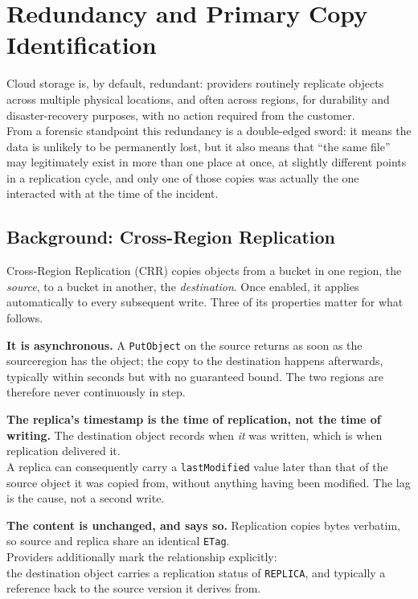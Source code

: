 \section{Redundancy and Primary Copy Identification}

Cloud storage is, by default, redundant: providers routinely replicate objects across multiple physical locations, and often across regions, for durability and disaster-recovery purposes, with no action required from the customer.\\
From a forensic standpoint this redundancy is a double-edged sword: it means the data is unlikely to be permanently lost, but it also means that ``the same file'' may legitimately exist in more than one place at once, at slightly different points in a replication cycle, and only one of those copies was actually the one interacted with at the time of the incident.

\subsection{Background: Cross-Region Replication}

Cross-Region Replication (CRR) copies objects from a bucket in one region, the \emph{source}, to a
bucket in another, the \emph{destination}. Once enabled, it applies automatically to every
subsequent write. Three of its properties matter for what follows.
\medskip

\noindent
\textbf{It is asynchronous.} A \texttt{PutObject} on the source returns as soon as the sourceregion has the object; the copy to the destination happens afterwards, typically within seconds but with no guaranteed bound. The two regions are therefore never continuously in step.
\medskip

\noindent
\textbf{The replica's timestamp is the time of replication, not the time of writing.} The destination object records when \emph{it} was written, which is when replication delivered it.\\
A replica can consequently carry a \texttt{lastModified} value later than that of the source object it was copied from, without anything having been modified. The lag is the cause, not a second write.
\medskip

\noindent
\textbf{The content is unchanged, and says so.} Replication copies bytes verbatim, so source and replica share an identical \texttt{ETag}.\\
Providers additionally mark the relationship explicitly:\\
the destination object carries a replication status of \texttt{REPLICA}, and typically a reference back to the source version it derives from.


